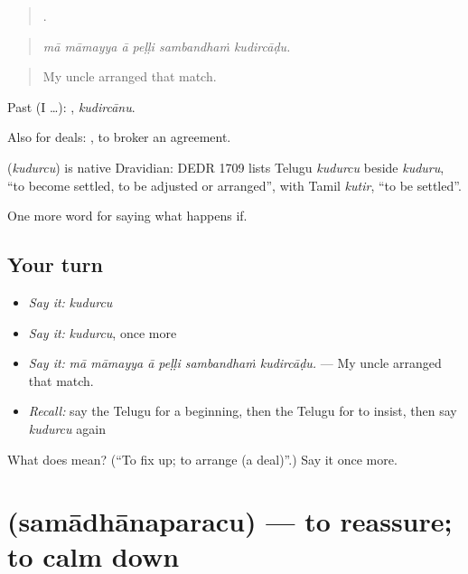 \begin{quote}
     .
\end{quote}

\begin{quote}
\emph{mā māmayya ā peḷḷi sambandhaṁ kudircāḍu.}
\end{quote}

\begin{quote}
My uncle arranged that match.
\end{quote}

Past (I …): , \emph{kudircānu}.

Also for deals:  , to broker an agreement.

\begin{cousinweb}
\textbf{} (\emph{kudurcu}) is native Dravidian: DEDR 1709 lists Telugu \emph{kudurcu} beside \emph{kuduru}, \textquotedblleft{}to become settled, to be adjusted or arranged\textquotedblright{}, with Tamil \emph{kutir}, \textquotedblleft{}to be settled\textquotedblright{}.
\end{cousinweb}

\begin{grammarlens}[title={What you've built}]
One more word for saying what happens if.
\end{grammarlens}

\subsection*{Your turn}
\begin{itemize}
\raggedright
  \item \emph{Say it:} \emph{kudurcu}
  \item \emph{Say it:} \emph{kudurcu}, once more
  \item \emph{Say it:} \emph{mā māmayya ā peḷḷi sambandhaṁ kudircāḍu.} — My uncle arranged that match.
  \item \emph{Recall:} say the Telugu for a beginning, then the Telugu for to insist, then say \emph{kudurcu} again
\end{itemize}

\begin{tcolorbox}[breakable,colback=teal!4,colframe=teal!35!black,title={Before you move on}]
What does  mean? (\textquotedblleft{}To fix up; to arrange (a deal)\textquotedblright{}.) Say it once more.
\end{tcolorbox}
\section[\texorpdfstring{\te{సమాధానపరచు} (samādhānaparacu)}{సమాధానపరచు (samādhānaparacu)}]{ (samādhānaparacu) — to reassure; to calm down}

